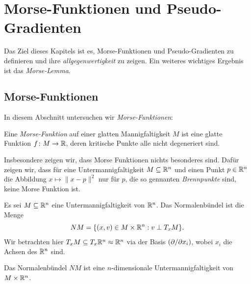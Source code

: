 \chapter{Morse-Funktionen und Pseudo-Gradienten}

Das Ziel dieses Kapitels ist es, Morse-Funktionen und Pseudo-Gradienten zu
definieren und ihre 
\textit{allgegenwertigkeit} zu zeigen. Ein weiteres wichtiges Ergebnis ist
das \textit{Morse-Lemma}.

\section{Morse-Funktionen}

In diesem Abschnitt untersuchen wir \textit{Morse-Funktionen}:

\begin{definition}
    \label{satz: morse-funktion}
    Eine \textit{Morse-Funktion} auf einer glatten Mannigfaltigkeit $M$ ist eine glatte Funktion
    $f \colon M \to { \mathbb R }$, deren kritische Punkte alle nicht degeneriert sind.
\end{definition}

Insbesondere zeigen wir, dass Morse Funktionen nichts besonderes sind. Dafür zeigen wir, dass für 
eine Untermannigfaltigkeit $M \subseteq { \mathbb R }^n$ und einen Punkt $p \in { \mathbb R }^n$ die Abbildung
$x \mapsto \| x - p \|^2$ nur für $p$, die so gennanten \textit{Brennpunkte}
sind, keine Morse Funktion ist.

\begin{definition}[Normalenbündel]
    \label{def: normalenbuendel}
    Es sei $M \subseteq { \mathbb R }^n$ eine Untermannigfaltigkeit von ${ \mathbb R }^n$. Das Normalenbündel ist die 
    Menge
    \[ NM = \{ (x, v) \in M \times { \mathbb R }^n : v \perp T_xM \} . \]
    Wir betrachten hier $T_xM \subseteq T_x{ \mathbb R }^n \approx { \mathbb R }^n$ via der Basis 
    $\left( { \partial } / { \partial } x_i \right)$, wobei $x_i$ die Achsen des ${ \mathbb R }^n$ sind.
\end{definition}

\begin{prop}
    \label{prop: NM ist untermannigfaltigkeit}
    Das Normalenbündel $NM$ ist eine $n$-dimensionale Untermannigfaltigkeit von $M \times { \mathbb R }^n$.
\end{prop}

